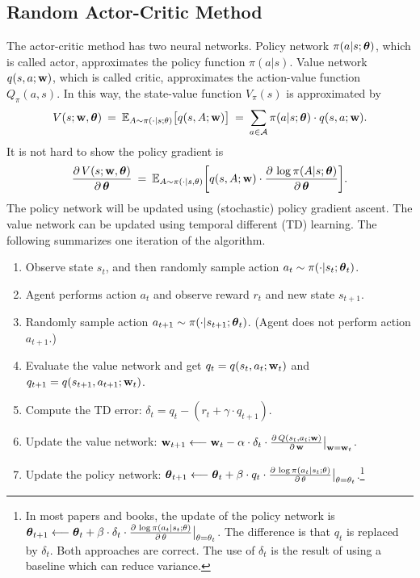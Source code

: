 \documentclass[11pt]{article}
\numberwithin{equation}{section}
\def\w{{\bf w}}
\def\AM{{\mathcal A}}
\def\EB{{\mathbb E}}
\def\tha{\mbox{\boldmath$\theta$\unboldmath}}
\begin{document}
\subsection{Random Actor-Critic Method} \label{sec:actor_critic_rand}


The actor-critic method has two neural networks.
Policy network $\pi (a | s; \tha ) $, which is called actor, approximates the policy function $\pi (a | s)$.
Value network $q (s, a; \w )$, which is called critic, approximates the action-value function $Q_\pi (a, s)$.
In this way, the state-value function $V_\pi (s )$ is approximated by
\begin{equation*}
    V (s ; \w , \tha )
    \: = \: \EB_{A \sim \pi (\cdot | s; \theta )} \big[ q (s, A ; \w ) \big]
    \: = \: \sum_{a\in \AM} \pi (a | s; \tha ) \cdot  q (s, a ; \w ) .
\end{equation*}
It is not hard to show the policy gradient is
\begin{equation*}
    \frac{\partial \, V (s ; \w , \tha ) }{ \partial \, \tha }
    \: = \: \EB_{A \sim \pi (\cdot | s , \theta )} \bigg[  q  (s, A; \w)  \cdot \frac{\partial \,  \log \pi (A | s; \tha )  }{\partial \, \tha }  \bigg] .
\end{equation*}
The policy network will be updated using (stochastic) policy gradient ascent.
The value network can be updated using temporal different (TD) learning.
The following summarizes one iteration of the algorithm.
\begin{enumerate}
    \item 
    Observe state $s_t$, and then randomly sample action $a_t \sim \pi (\cdot | s_t ; \tha_t )$.
    \item
    Agent performs action $a_t$ and observe reward $r_t$ and new state $s_{t+1}$.
    \item
    Randomly sample action $a_{t+1} \sim \pi (\cdot | s_{t+1} ; \tha_t )$. (Agent does not perform action $a_{t+1}$.)
    \item
    Evaluate the value network and get $q_t = q (s_t , a_t ; \w_t )$ and $q_{t+1} = q (s_{t+1} , a_{t+1} ; \w_t )$.
    \item
    Compute the TD error: $\delta_t = q_t - (r_t + \gamma \cdot q_{t+1})$.
    \item
    Update the value network: $\w_{t+1} \longleftarrow \w_{t} - \alpha \cdot \delta_t \cdot \frac{ \partial \, Q (s_t , a_t ; \w )}{\partial \, \w} \big|_{\w=\w_t }$.
    \item
    Update the policy network: $\tha_{t+1} \longleftarrow \tha_{t} + \beta \cdot q_t \cdot \frac{ \partial \, \log \pi ( a_t | s_t ; \theta )}{\partial \, \theta} \big|_{\theta =\theta_t }$.\footnote{In most papers and books, the update of the policy network is $\tha_{t+1} \longleftarrow \tha_{t} + \beta \cdot \delta_t \cdot \frac{ \partial \, \log \pi ( a_t | s_t ; \theta )}{\partial \, \theta} \big|_{\theta =\theta_t }$.
The difference is that $q_t$ is replaced by $\delta_t$.
Both approaches are correct.
The use of $\delta_t$ is the result of using a baseline which can reduce variance.}
\end{enumerate}
\end{document}
